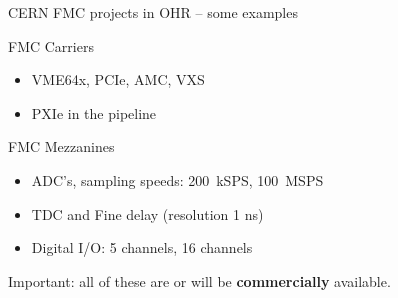 \documentclass[compress,red]{beamer}
\begin{document}
% 

\begin{frame}{CERN FMC projects in OHR -- some examples}
\begin{block}{FMC Carriers}
	\begin{itemize}
		\item VME64x, PCIe, AMC, VXS
		\item PXIe in the pipeline
	\end{itemize}
\end{block}

\begin{block}{FMC Mezzanines}
	\begin{itemize}
		\item ADC's, sampling speeds: 200~kSPS, 100~MSPS
		\item TDC and Fine delay (resolution 1 ns)
		\item Digital I/O: 5 channels, 16 channels
	\end{itemize}
\end{block}
Important: all of these are or will be \textbf{commercially} available.

\end{frame}
\end{document}
